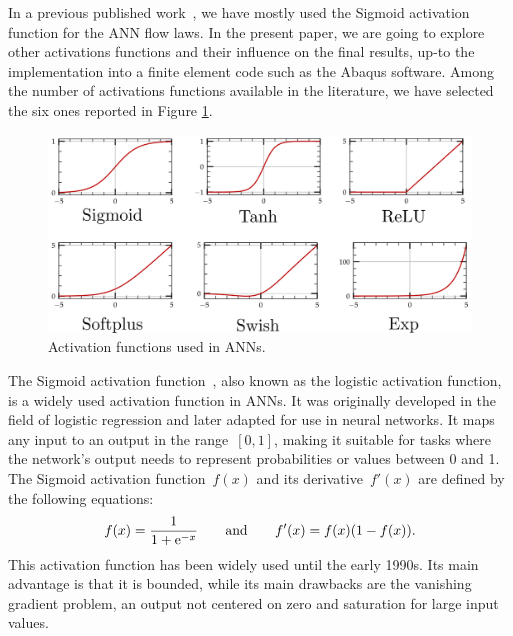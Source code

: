 \documentclass[algorithms,article,submit,pdftex,oneauthors]{Definitions/mdpi}
\DeclareRobustCommand{\e}[1]{{\rm e}^{#1}}
\begin{document}
In a previous published work~\cite{Pantale-2021-EIN, Pantale-2023-DIA}, we have mostly used the Sigmoid activation function for the ANN flow laws.
In the present paper, we are going to explore other activations functions and their influence on the final results, up-to the implementation into a finite element code such as the Abaqus software.
Among the number of activations functions available in the literature, we have selected the six ones reported in Figure \ref{fig:ActFunctions}.
\begin{figure}[h]
\centering
\includegraphics[width=0.8\columnwidth]{Figures/ActFunctions}
\caption{Activation functions used in ANNs.}
\label{fig:ActFunctions}
\end{figure}

The Sigmoid activation function~\cite{Han-1995-ISF}, also known as the logistic activation function, is a widely used activation function in ANNs.
It was originally developed in the field of logistic regression and later adapted for use in neural networks.
It maps any input to an output in the range~$[0,1]$, making it suitable for tasks where the network's output needs to represent probabilities or values between 0 and 1.
The Sigmoid activation function~$f(x)$ and its derivative~$f'(x)$ are defined by the following equations:
\begin{equation}
f(x) = \frac{1}{1+\e{-x}}\qquad \text{and}\qquad f'(x) = f(x)\left(1-f(x)\right).\label{eq:act-sig}
\end{equation}
This activation function has been widely used until the early 1990s.
Its main advantage is that it is bounded, while its main drawbacks are the vanishing gradient problem, an output not centered on zero and saturation for large input values.
\end{document}
